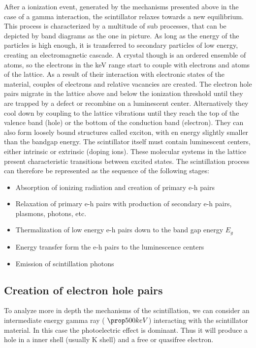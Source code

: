 After a ionization event, generated by the mechanisms presented above in the case of a gamma interaction, the scintillator relaxes towards a new equilibrium. This process is characterized by a multitude of sub processes, that can be depicted by band diagrams as the one in picture.
As long as the energy of the particles is high enough, it is transferred to secondary particles of low energy, creating an electromagnetic cascade.
A crystal though is an ordered ensemble of atoms, so the electrons in the keV range start to couple with electrons and atoms of the lattice. As a result of their interaction with electronic states of the material, couples of electrons and relative vacancies are created. The electron hole pairs migrate in the lattice above and below the ionization threshold until they are trapped by a defect or recombine on a luminescent center. Alternatively they cool down by coupling to the lattice vibrations until they reach the top of the valence band (hole) or the bottom of the conduction band (electron). They can also form loosely bound structures called exciton, with en energy slightly smaller than the bandgap energy.
The scintillator itself must contain luminescent centers, either intrinsic or extrinsic (doping ions). These molecular systems in the lattice present characteristic transitions between excited states.
The scintillation process can therefore be represented as the sequence of the following stages\cite{Rodnyi1997}: 

\begin{itemize}
\item Absorption of ionizing radiation and creation of primary e-h pairs
\item Relaxation of primary e-h pairs with production of secondary e-h pairs, plasmons, photons, etc.
\item Thermalization of low energy e-h pairs down to the band gap energy $E_{g}$
\item Energy transfer form the e-h pairs to the luminescence centers
\item Emission of scintillation photons
\end{itemize}

\subsection{Creation of electron hole pairs}

To analyze more in depth the mechanisms of the scintillation, we can consider an intermediate energy gamma ray ( $\prop 500 keV$) interacting with the scintillator material. In this case the photoelectric effect is dominant. Thus it will produce a hole in a inner shell (usually K shell) and a free or quasifree electron.


